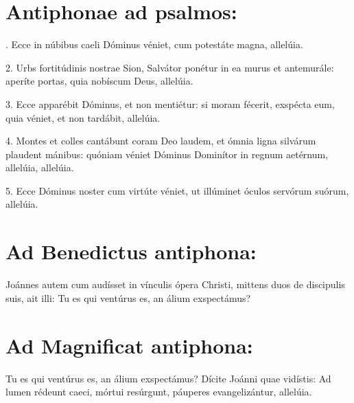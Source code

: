 \documentclass[a4paper, twoside, 12pt]{article}
\begin{document}
\section{Antiphonae ad psalmos:}

. Ecce in núbibus caeli Dóminus véniet,
cum potestáte magna, allelúia.

2. Urbs fortitúdinis nostrae Sion,
Salvátor ponétur in ea murus et antemurále:
aperíte portas,
quia nobíscum Deus, allelúia.

3. Ecce apparébit Dóminus,
et non mentiétur:
si moram fécerit, exspécta eum, 
quia véniet, et non tardábit, allelúia.

4. Montes et colles cantábunt coram Deo laudem,
et ómnia ligna silvárum plaudent mánibus:
quóniam véniet Dóminus Dominítor in regnum aetérnum, allelúia, allelúia.

5. Ecce Dóminus noster cum virtúte véniet,
ut illúminet óculos servórum suórum, allelúia.

\section{Ad Benedictus antiphona:}

Joánnes autem cum audísset in vínculis ópera Christi,
mittens duos de discipulis suis, ait illi:
Tu es qui ventúrus es, an álium exspectámus?

\section{Ad Magnificat antiphona:}

Tu es qui ventúrus es, an álium exspectámus?
Dícite Joánni quae vidístis:
Ad lumen rédeunt caeci,
mórtui resúrgunt, 
páuperes evangelizántur, allelúia.
\end{document}
